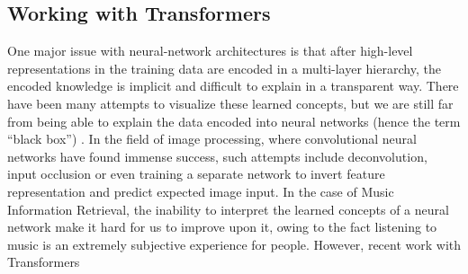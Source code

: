 \documentclass[../main.tex]{subfiles}
\begin{document}
\subsection{Working with Transformers}
One major issue with neural-network architectures is that after high-level representations in the training data are encoded in a multi-layer hierarchy, the encoded knowledge is implicit and difficult to explain in a transparent way. There have been many attempts to visualize these learned concepts, but we are still far from being able to explain the data encoded into neural networks (hence the term “black box”) \cite{Bilal_et_al:1}. In the field of image processing, where convolutional neural networks have found immense success, such attempts include deconvolution, input occlusion or even training a separate network to invert feature representation and predict expected image input. \cite{Dosovitskiy_Brox:1,Zeiler_Fergus:1}  In the case of Music Information Retrieval, the inability to interpret the learned concepts of a neural network make it hard for us to improve upon it, owing to the fact listening to music is an extremely subjective experience for people. However, recent work with Transformers



\end{document}
